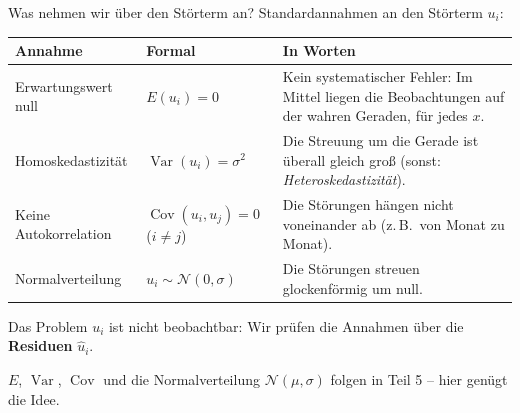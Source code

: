 \documentclass[aspectratio=169,11pt]{beamer}
\begin{document}
\begin{frame}{Was nehmen wir über den Störterm an?}
  \small
  Standardannahmen an den Störterm $u_i$:
  \begin{center}
    \renewcommand{\arraystretch}{1.08}
    \begin{tabular}{@{}l l L{7.2cm}@{}}
      \toprule
      \textbf{Annahme} & \textbf{Formal} & \textbf{In Worten} \\
      \midrule
      Erwartungswert null  & $E(u_i) = 0$ & Kein systematischer Fehler: Im Mittel liegen die Beobachtungen
                                            auf der wahren Geraden, für jedes $x$. \\
      Homoskedastizität    & $\operatorname{Var}(u_i) = \sigma^{2}$ & Die Streuung um die Gerade ist überall gleich groß
                                            (sonst: \emph{Heteroskedastizität}). \\
      Keine Autokorrelation & $\operatorname{Cov}(u_i,u_j) = 0$ ($i \ne j$) & Die Störungen hängen nicht voneinander ab
                                            (z.\,B.\ von Monat zu Monat). \\
      Normalverteilung     & $u_i \sim \mathcal{N}(0,\sigma)$ & Die Störungen streuen
                                            glockenförmig um null. \\
      \bottomrule
    \end{tabular}
  \end{center}
  \begin{alertblock}{Das Problem}
    $u_i$ ist nicht beobachtbar: Wir prüfen die Annahmen über die \textbf{Residuen} $\hat{u}_i$.
  \end{alertblock}
  \footnotesize $E$, $\operatorname{Var}$, $\operatorname{Cov}$ und die Normalverteilung
  $\mathcal{N}(\mu, \sigma)$ folgen in Teil 5 -- hier genügt die Idee.
\end{frame}
\end{document}
